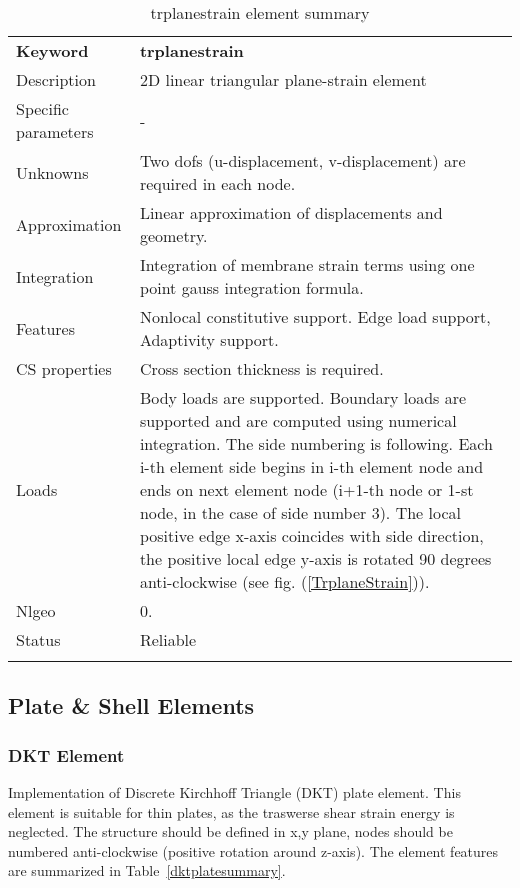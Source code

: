 \documentclass[a4paper]{article}
\newcommand{\param}[1]{\texttt{#1}} %
\newcommand{\templabel}{}%
\newcommand{\tempcaption}{}%
\newcounter{nelpar}
\newenvironment{elementsummary}[5]{%
  \gdef\tempcaption{#4}%
  \gdef\templabel{#5}%
  \setcounter{nelpar}{0}%
  \begin{center} %
    \begin{table}[!htb] %
      \begin{tabular}{|l|p{9cm}|}\hline %
        {\bf Keyword} & \bf{#1}\\ %
        {Description} & {#2}\\ %
        {Specific parameters} & {#3}\\ \hline %
}{
  \\ \hline %
      \end{tabular}%
      \caption{\tempcaption}%
      \label{\templabel}%
    \end{table}%
  \end{center}%
}
\newcommand{\elementParam}[1]{%
  \ifthenelse{\value{nelpar}>0} %
             {&{#1}}%
             {\setcounter{nelpar}{1}Parameters&{#1}}%
             \\%
}
\newcommand{\elementDescription}[2]{{#1} & {#2}\\ }
\begin{document}
\begin{elementsummary}{trplanestrain}{2D linear triangular plane-strain element}{-}{trplanestrain element summary}{trplanestrainsummary}
\elementDescription{Unknowns}{Two dofs (u-displacement, v-displacement) are required in each node.}
\elementDescription{Approximation}{Linear approximation of displacements and geometry.}
\elementDescription{Integration}{Integration of membrane strain terms using one point gauss integration formula.}
\elementDescription{Features}{Nonlocal constitutive support. Edge load support, Adaptivity support.}
\elementDescription{CS properties}{Cross section thickness is required.}
\elementDescription{Loads}{Body loads are supported. Boundary loads are supported and are computed  using numerical integration. The side numbering is following.
Each i-th element side begins in i-th element node and ends on next element node (i+1-th node or 1-st node, in the case of side number 3).
The local positive edge x-axis coincides with side direction, the positive local edge y-axis is rotated 90 degrees anti-clockwise (see fig. (\ref{TrplaneStrain})).}
\elementDescription{Nlgeo}{0.}
\elementDescription{Status}{Reliable}
\end{elementsummary}




\clearpage
\subsection{Plate \& Shell Elements}


\subsubsection {DKT Element}
\label{dkt}
Implementation of Discrete Kirchhoff Triangle (DKT) plate element.
This element is suitable for thin plates, as the traswerse shear strain energy is neglected.
The structure should be defined in x,y plane, nodes should be numbered anti-clockwise (positive rotation around
z-axis). The element features are summarized in Table~\ref{dktplatesummary}.
\end{document}
